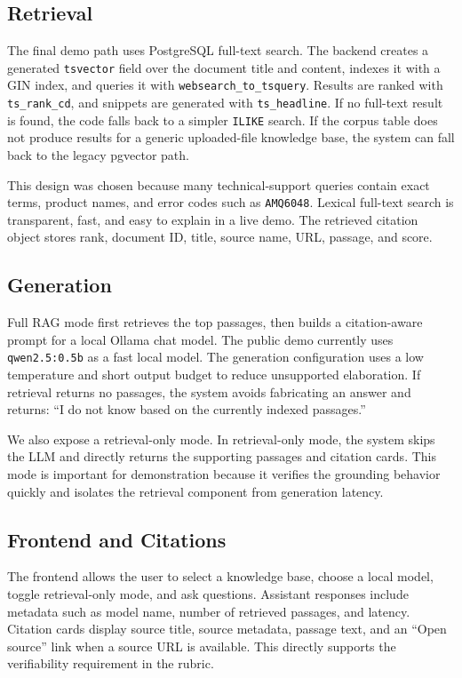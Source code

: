 \documentclass[paper=a4, fontsize=11pt]{scrartcl}
\begin{document}
\subsection{Retrieval}

The final demo path uses PostgreSQL full-text search. The backend creates a generated \texttt{tsvector} field over the document title and content, indexes it with a GIN index, and queries it with \texttt{websearch\_to\_tsquery}. Results are ranked with \texttt{ts\_rank\_cd}, and snippets are generated with \texttt{ts\_headline}. If no full-text result is found, the code falls back to a simpler \texttt{ILIKE} search. If the corpus table does not produce results for a generic uploaded-file knowledge base, the system can fall back to the legacy pgvector path.

This design was chosen because many technical-support queries contain exact terms, product names, and error codes such as \texttt{AMQ6048}. Lexical full-text search is transparent, fast, and easy to explain in a live demo. The retrieved citation object stores rank, document ID, title, source name, URL, passage, and score.

\subsection{Generation}

Full RAG mode first retrieves the top passages, then builds a citation-aware prompt for a local Ollama chat model. The public demo currently uses \texttt{qwen2.5:0.5b} as a fast local model. The generation configuration uses a low temperature and short output budget to reduce unsupported elaboration. If retrieval returns no passages, the system avoids fabricating an answer and returns: ``I do not know based on the currently indexed passages.''

We also expose a retrieval-only mode. In retrieval-only mode, the system skips the LLM and directly returns the supporting passages and citation cards. This mode is important for demonstration because it verifies the grounding behavior quickly and isolates the retrieval component from generation latency.

\subsection{Frontend and Citations}

The frontend allows the user to select a knowledge base, choose a local model, toggle retrieval-only mode, and ask questions. Assistant responses include metadata such as model name, number of retrieved passages, and latency. Citation cards display source title, source metadata, passage text, and an ``Open source'' link when a source URL is available. This directly supports the verifiability requirement in the rubric.
\end{document}

